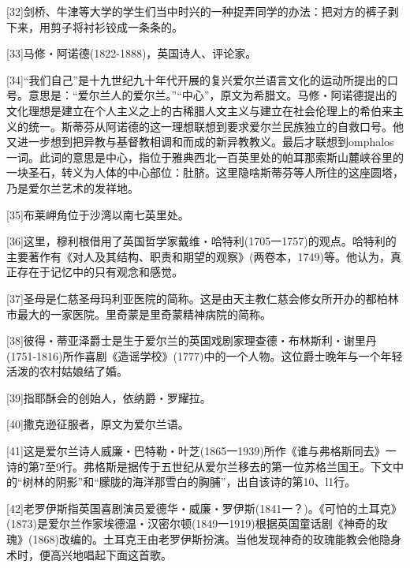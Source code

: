 \documentclass{article}
\begin{document}
[32]剑桥、牛津等大学的学生们当中时兴的一种捉弄同学的办法：把对方的裤子剥下来，用剪子将衬衫铰成一条条的。



[33]马修・阿诺德(1822-1888)，英国诗人、评论家。



[34]“我们自己”是十九世纪九十年代开展的复兴爱尔兰语言文化的运动所提出的口号。意思是：“爱尔兰人的爱尔兰。”“中心”，原文为希腊文。马修・阿诺德提出的文化理想是建立在个人主义之上的古稀腊人文主义与建立在社会伦理上的希伯来主义的统一。斯蒂芬从阿诺德的这一理想联想到要求爱尔兰民族独立的自救口号。他又进一步想到把异教与基督教相调和而成的新异教教义。最后才联想到omphalos一词。此词的意思是中心，指位于雅典西北一百英里处的帕耳那索斯山麓峡谷里的一块圣石，转义为人体的中心部位：肚脐。这里隐啥斯蒂芬等人所住的这座圆塔，乃是爱尔兰艺术的发祥地。



[35]布莱岬角位于沙湾以南七英里处。



[36]这里，穆利根借用了英国哲学家戴维・哈特利(1705一1757)的观点。哈特利的主要著作有《对人及其结构、职责和期望的观察》(两卷本，1749)等。他认为，真正存在于记忆中的只有观念和感觉。



[37]圣母是仁慈圣母玛利亚医院的简称。这是由天主教仁慈会修女所开办的都柏林市最大的一家医院。里奇蒙是里奇蒙精神病院的简称。



[38]彼得・蒂亚泽爵士是生于爱尔兰的英国戏剧家理查德・布林斯利・谢里丹(1751-1816)所作喜剧《造谣学校》(1777)中的一个人物。这位爵士晚年与一个年轻活泼的农村姑娘结了婚。



[39]指耶酥会的创始人，依纳爵・罗耀拉。



[40]撒克逊征服者，原文为爱尔兰语。



[41]这是爱尔兰诗人威廉・巴特勒・叶芝(1865一1939)所作《谁与弗格斯同去》一诗的第7至9行。弗格斯是据传于五世纪从爱尔兰移去的第一位苏格兰国王。下文中的“树林的阴影”和“朦胧的海洋那雪白的胸脯”，出自该诗的第10、l1行。



[42]老罗伊斯指英国喜剧演员爱德华・威廉・罗伊斯(1841一？)。《可怕的土耳克》(1873)是爱尔兰作家埃德温・汉密尔顿(1849一1919)根据英国童话剧《神奇的玫瑰》(1868)改编的。土耳克王由老罗伊斯扮演。当他发现神奇的玫瑰能教会他隐身术时，便高兴地唱起下面这首歌。
\end{document}
